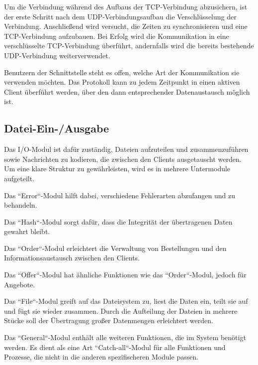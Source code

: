 Um die Verbindung während des Aufbaus der TCP-Verbindung abzusichern, ist der erste Schritt nach dem UDP-Verbindungsaufbau die Verschlüsselung der Verbindung. Anschließend wird versucht, die Zeiten zu synchronisieren und eine TCP-Verbindung aufzubauen. Bei Erfolg wird die Kommunikation in eine verschlüsselte TCP-Verbindung überführt, andernfalls wird die bereits bestehende UDP-Verbindung weiterverwendet.

Benutzern der Schnittstelle steht es offen, welche Art der Kommunikation sie verwenden möchten. Das Protokoll kann zu jedem Zeitpunkt in einen aktiven Client überführt werden, über den dann entsprechender Datenaustausch möglich ist.

\subsection{Datei-Ein-/Ausgabe}
Das I/O-Modul ist dafür zuständig, Dateien aufzuteilen und zusammenzuführen sowie Nachrichten zu kodieren, die zwischen den Clients ausgetauscht werden. Um eine klare Struktur zu gewährleisten, wird es in mehrere Untermodule aufgeteilt.

Das “Error“-Modul hilft dabei, verschiedene Fehlerarten abzufangen und zu behandeln.

Das “Hash“-Modul sorgt dafür, dass die Integrität der übertragenen Daten gewahrt bleibt.

Das “Order“-Modul erleichtert die Verwaltung von Bestellungen und den Informationsaustausch zwischen den Clients.

Das “Offer“-Modul hat ähnliche Funktionen wie das “Order“-Modul, jedoch für Angebote.

Das “File“-Modul greift auf das Dateisystem zu, liest die Daten ein, teilt sie auf und fügt sie wieder zusammen. Durch die Aufteilung der Dateien in mehrere Stücke soll der Übertragung großer Datenmengen erleichtert werden.

Das “General“-Modul enthält alle weiteren Funktionen, die im System benötigt werden. Es dient als eine Art “Catch-all“-Modul für alle Funktionen und Prozesse, die nicht in die anderen spezifischeren Module passen.
